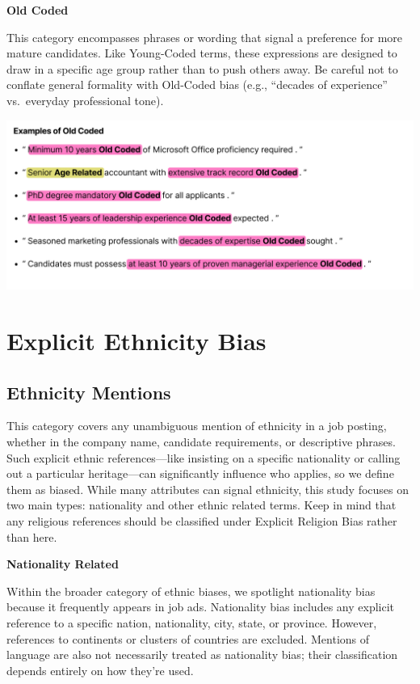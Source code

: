 \documentclass[
]{book}
\begin{document}
{\textbf{Old Coded}}

This category encompasses phrases or wording that signal a preference for more mature candidates. Like Young-Coded terms, these expressions are designed to draw in a specific age group rather than to push others away. Be careful not to conflate general formality with Old-Coded bias (e.g., ``decades of experience'' vs.~everyday professional tone).

\includegraphics{images/Old_Coded.png}

\section{Explicit Ethnicity Bias}\label{explicit-ethnicity-bias}

\subsection*{Ethnicity Mentions}\label{ethnicity-bias}

This category covers any unambiguous mention of ethnicity in a job posting, whether in the company name, candidate requirements, or descriptive phrases. Such explicit ethnic references---like insisting on a specific nationality or calling out a particular heritage---can significantly influence who applies, so we define them as biased. While many attributes can signal ethnicity, this study focuses on two main types: nationality and other ethnic related terms. Keep in mind that any religious references should be classified under Explicit Religion Bias rather than here.

{\textbf{Nationality Related}}

Within the broader category of ethnic biases, we spotlight nationality bias because it frequently appears in job ads. Nationality bias includes any explicit reference to a specific nation, nationality, city, state, or province. However, references to continents or clusters of countries are excluded. Mentions of language are also not necessarily treated as nationality bias; their classification depends entirely on how they're used.
\end{document}
